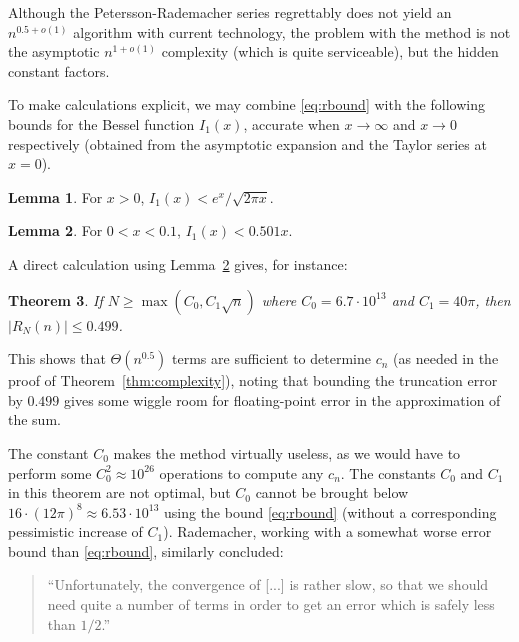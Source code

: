 \documentclass{amsart}
\newtheorem{theorem}{Theorem}[section]
\theoremstyle{definition}
\newtheorem{lemma}[theorem]{Lemma}
\theoremstyle{remark}
\begin{document}
Although the Petersson-Rademacher series regrettably does not yield
an $n^{0.5+o(1)}$ algorithm with current technology,
the problem with the method is not the asymptotic
$n^{1+o(1)}$ complexity (which is quite serviceable),
but the hidden constant factors.

To make calculations explicit, we may combine \eqref{eq:rbound}
with the following bounds for the Bessel function $I_1(x)$, accurate when $x \to \infty$ and $x \to 0$ respectively
(obtained from the asymptotic expansion and the Taylor series at $x = 0$).

\begin{lemma}
For $x > 0$, $I_1(x) < e^x / \sqrt{2 \pi x}$.
\label{lem:besselexp}
\end{lemma}

\begin{lemma}
For $0 < x < 0.1$, $I_1(x) < 0.501x$.
\label{lem:bessel0}
\end{lemma}

A direct calculation using Lemma~\ref{lem:bessel0} gives, for instance:

\begin{theorem}
If $N \ge \max(C_0, C_1 \sqrt{n})$ where $C_0 = 6.7 \cdot 10^{13}$ and $C_1 = 40 \pi$, then $|R_N(n)| \le 0.499$.
\end{theorem}

This shows that $\Theta(n^{0.5})$ terms are sufficient to determine $c_n$ (as needed
in the proof of Theorem~\ref{thm:complexity}), noting that
bounding the truncation error by $0.499$ gives some wiggle room
for floating-point error in the approximation of the sum.

The constant $C_0$ makes the method virtually useless, as we would
have to perform some $C_0^2 \approx 10^{26}$ operations
to compute any $c_n$.
The constants $C_0$ and $C_1$ in this theorem are not optimal,
but $C_0$ cannot be brought below $16 \cdot (12 \pi)^8 \approx 6.53 \cdot 10^{13}$
using the bound \eqref{eq:rbound} (without a corresponding pessimistic increase of $C_1$).
Rademacher, working with a somewhat worse error bound than
\eqref{eq:rbound}, similarly concluded:

\begin{quotation}
``Unfortunately, the convergence of [...] is rather slow, so that we should need quite a number of
terms in order to get an error which is safely less than $1/2$.''
\end{quotation}
\end{document}
